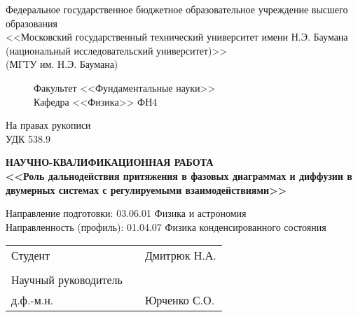\documentclass[%
candidate, %
subf, %
times %
]{disser}
\begin{document}
%


\begin{titlepage}

\begin{center}
{
\footnotesize{}
Федеральное государственное бюджетное образовательное учреждение высшего образования\\
<<Московский государственный технический университет имени Н.Э. Баумана\\ (национальный исследовательский университет)>>\\(МГТУ им. Н.Э. Баумана)\\
}
\end{center}
\begin{figure}[h!]

\begin{minipage}[b]{0.9\textwidth}\centering
Факультет <<Фундаментальные науки>>\\
Кафедра <<Физика>> ФН4
\\\vspace{1.5cm}
\end{minipage}
\end{figure}
\begin{flushright}
На правах рукописи\\
УДК 538.9
\end{flushright}

\vspace{10mm}

\begin{center}
\textbf{НАУЧНО-КВАЛИФИКАЦИОННАЯ РАБОТА}\\\vspace{5mm}
\textbf{<<Роль дальнодействия притяжения в фазовых диаграммах и диффузии в двумерных системах с регулируемыми взаимодействиями>>}
\end{center}


\vspace{5mm}

\begin{flushleft}
Направление подготовки: 03.06.01 Физика и астрономия\\
Направленность (профиль): 01.04.07 Физика конденсированного состояния
\end{flushleft}

\vspace{5mm}

\begin{table}[h]
\begin{tabular}{lll}
Студент\hspace{4cm} & \underline{\hspace{4cm}} & \hspace{2cm}Дмитрюк Н.А.\\\\
Научный руководитель\\д.ф.-м.н. & \underline{\hspace{4cm}} & \hspace{2cm}Юрченко С.О.
\end{tabular}
\end{table}


\end{titlepage}
\end{document}
